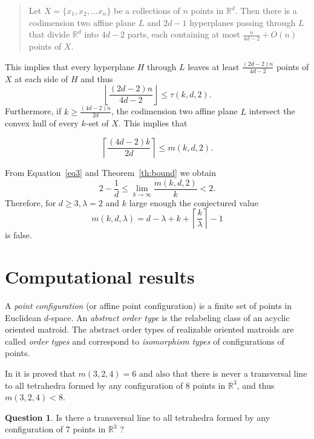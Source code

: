 \documentclass[11pt]{amsart}
\theoremstyle{plain}
\theoremstyle{definition}
\newtheorem{question}[theorem]{Question}
\theoremstyle{remark}
\begin{document}
\begin{quote}
Let $X=\{x_1, x_2, \dots x_n\}$  be a collections of $n$ points in $\mathbb{R}^{d}$.  Then there is a codimension two affine plane $L$ and $2d-1$ hyperplanes passing through $L$ that divide $\mathbb{R}^{d}$ into $4d-2$ parts, each containing at most $\frac{n}{4d-2} + O(n)$ points of $X$.
\end{quote}

This implies that every hyperplane $H$ through $L$ leaves at least $\frac{(2d-2)n}{4d-2}$ points of $X$ at each side of $H$ and thus
$$
\left\lfloor \frac{(2d-2)n}{4d-2}\right\rfloor{\leqslant} \tau(k,d,2).
$$
Furthermore, if $k{\geqslant}  \frac{(4d-2)n}{2d}$,  the codimension two affine plane $L$ intersect the convex hull of every $k$-set of $X$. This implies that

\begin{equation}\label{eq3}
\left\lceil \frac{(4d-2)k}{2d}\right\rceil{\leqslant} m(k,d,2).
\end{equation}

From Equation~\eqref{eq3} and Theorem~\ref{th:bound} we obtain 
$$
2-\frac{1}{d}{\leqslant} \lim_{k\to\infty}\frac{m(k,d,2)}{k} < 2.
$$
Therefore, for $d{\geqslant}3, \lambda=2$ and $k$ large enough the conjectured value \cite[Conjecture 1]{ABMR} 
$$
m(k,d,\lambda )=d-\lambda +k+\left\lceil \frac{k}{\lambda }\right\rceil -1
$$
is false.

\section {Computational results}\label{computer}

A \emph{point configuration} (or affine point configuration) is a finite set of points in Euclidean $d$-space. An \emph{abstract order type} is the relabeling class of an acyclic oriented matroid. The abstract order types of realizable oriented matroids are called {\em order types} and correspond to {\em isomorphism types} of configurations of points.
\medskip

In \cite{ABMR} it is proved that $m(3,2,4)=6$ and also that there is never a transversal line to all tetrahedra formed by any configuration of 8 points in ${\mathbb{R}}^3$, and thus $m(3,2,4)<8$.

\begin{question}
Is there a transversal line to all tetrahedra formed by any configuration of 7 points in ${\mathbb{R}}^3$ ?
\end{question}
\end{document}

